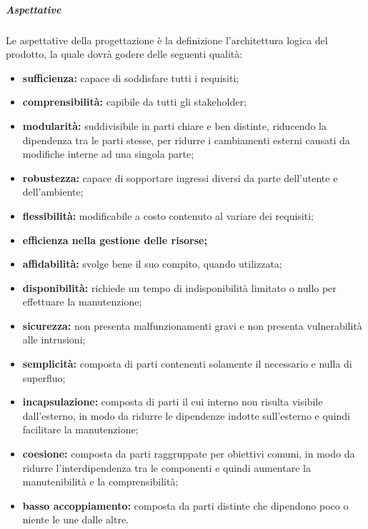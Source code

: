				\subparagraph{Aspettative}
					Le aspettative della progettazione è la definizione l'architettura logica del prodotto, la quale dovrà godere delle seguenti qualità:
					\begin{itemize}
						\item \textbf{sufficienza:} capace di soddisfare tutti i requisiti;
						\item \textbf{comprensibilità:} capibile da tutti gli stakeholder;
						\item \textbf{modularità:} suddivisibile in parti chiare e ben distinte, riducendo la dipendenza tra le parti stesse, per ridurre i cambiamenti esterni causati da modifiche interne ad una singola parte;
						\item \textbf{robustezza:} capace di sopportare ingressi diversi da parte dell'utente e dell'ambiente;
						\item \textbf{flessibilità:} modificabile a costo contenuto al variare dei requisiti;
						\item \textbf{efficienza nella gestione delle risorse;}
						\item \textbf{affidabilità:} svolge bene il suo compito, quando utilizzata;
						\item \textbf{disponibilità:} richiede un tempo di indisponibilità limitato o nullo per effettuare la manutenzione;
						\item \textbf{sicurezza:} non presenta malfunzionamenti gravi e non presenta vulnerabilità alle intrusioni;
						\item \textbf{semplicità:} composta di parti contenenti solamente il necessario e nulla di superfluo;
						\item \textbf{incapsulazione:} composta di parti il cui interno non risulta visibile dall'esterno, in modo da ridurre le dipendenze indotte sull'esterno e quindi facilitare la manutenzione;
						\item \textbf{coesione:} composta da parti raggruppate per obiettivi comuni, in modo da ridurre l'interdipendenza tra le componenti e quindi aumentare la manutenibilità e la comprensibilità;
						\item \textbf{basso accoppiamento:} composta da parti distinte che dipendono poco o niente le une dalle altre.
					\end{itemize}
				
